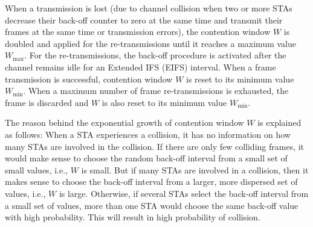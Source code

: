 When a transmission is lost (due to channel collision when two or more STAs decrease their back-off counter to zero at the same time and transmit their frames at the same time or transmission errors), the contention window $W$ is doubled and applied for the re-transmissions until it reaches a maximum value $W_{\max}$. For the re-transmissions, the back-off procedure is activated after the channel remains idle for an Extended IFS (EIFS) interval. When a frame transmission is successful, contention window $W$ is reset to its minimum value $W_{\min}$. When a maximum number of frame re-transmissions is exhausted, the frame is discarded and $W$ is also reset to its minimum value $W_{\min}$.


The reason behind the exponential growth of contention window $W$ is explained as follows: When a STA experiences a collision, it has no information on how many STAs are involved in the collision. If there are only few colliding frames, it would make sense to choose the random back-off interval from a small set of small values, i.e., $W$ is small. But if many STAs are involved in a collision, then it makes sense to choose the back-off interval from a larger, more dispersed set of values, i.e., $W$ is large. Otherwise, if several STAs select the back-off interval from a small set of values, more than one STA would choose the same back-off value with high probability. This will result in high probability of collision.


